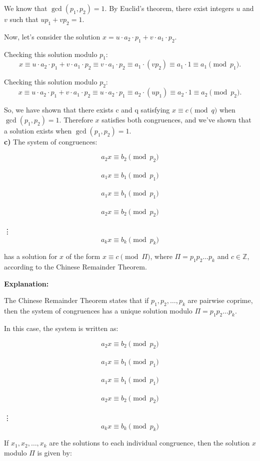 \documentclass[12pt]{article}
\begin{document}
We know that $\gcd(p_1, p_2) = 1$. By Euclid's theorem, there exist integers $u$ and $v$ such that $up_1 + vp_2 = 1$.

Now, let's consider the solution $x = u \cdot a_2 \cdot p_1 + v \cdot a_1 \cdot p_2$.

Checking this solution modulo $p_1$:
\[x \equiv u \cdot a_2 \cdot p_1 + v \cdot a_1 \cdot p_2 \equiv v \cdot a_1 \cdot p_2 \equiv a_1 \cdot (vp_2) \equiv a_1 \cdot 1 \equiv a_1 \pmod{p_1}.\]

Checking this solution modulo $p_2$:
\[x \equiv u \cdot a_2 \cdot p_1 + v \cdot a_1 \cdot p_2 \equiv u \cdot a_2 \cdot p_1 \equiv a_2 \cdot (up_1) \equiv a_2 \cdot 1 \equiv a_2 \pmod{p_2}.\]

So, we have shown that there exists c and q satisfying $x \equiv c \pmod{q}$ when $\gcd(p_1, p_2) = 1$. Therefore  $x$ satisfies both congruences, and we've shown that a solution exists when $\gcd(p_1, p_2) = 1$.
\\



\textbf{c)}
The system of congruences:


$$a_2x \equiv b_2 \pmod{p_2}$$ \\
$$a_1x \equiv b_1 \pmod{p_1} $$\\
$$a_1x \equiv b_1 \pmod{p_1} $$\\
$$a_2x \equiv b_2 \pmod{p_2} $$\\
\vdots \\
$$a_kx \equiv b_k \pmod{p_k}$$


has a solution for \(x\) of the form \(x \equiv c \pmod{\Pi}\), where \(\Pi = p_1p_2\ldots p_k\) and \(c \in \mathbb{Z}\), according to the Chinese Remainder Theorem.

\textbf{Explanation:}

The Chinese Remainder Theorem states that if \(p_1, p_2, \ldots, p_k\) are pairwise coprime, then the system of congruences has a unique solution modulo \(\Pi = p_1p_2\ldots p_k\).

In this case, the system is written as:


$$a_2x \equiv b_2 \pmod{p_2}$$ \\
$$a_1x \equiv b_1 \pmod{p_1}$$ \\
$$a_1x \equiv b_1 \pmod{p_1}$$ \\
$$a_2x \equiv b_2 \pmod{p_2}$$ \\
\vdots \\
$$a_kx \equiv b_k \pmod{p_k}$$


If \(x_1, x_2, \ldots, x_k\) are the solutions to each individual congruence, then the solution \(x\) modulo \(\Pi\) is given by:
\end{document}
